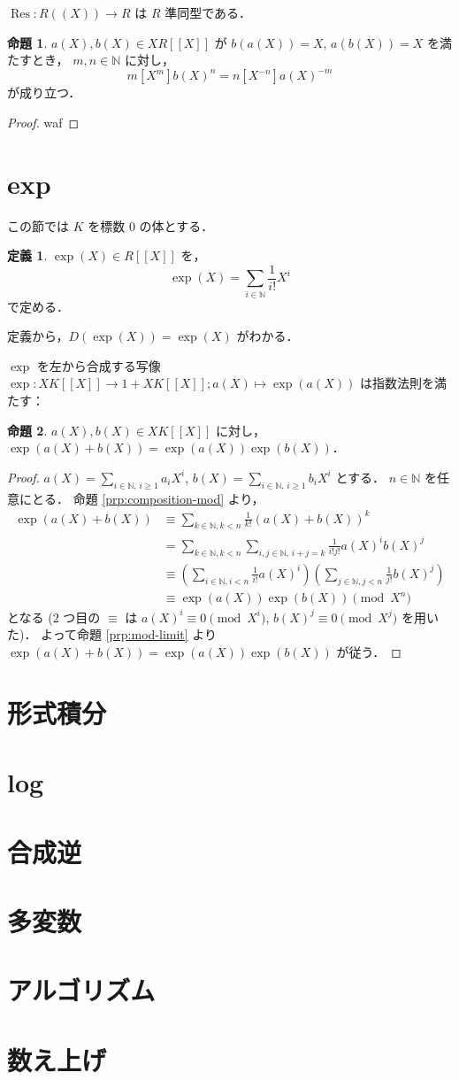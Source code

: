 \documentclass{jsarticle}
\DeclareMathOperator{\Res}{Res}
\newcommand{\N}{\mathbb{N}}
\newcommand{\longto}{\longrightarrow}
\theoremstyle{definition}
\newtheorem*{Dfn}{定義}
\newtheorem{Prp}{命題}
\newenvironment{dfn}{\vspace{1ex}\begin{screen}\begin{Dfn}}{\end{Dfn}\end{screen}\vspace{1ex}}
\newenvironment{prp}{\vspace{1ex}\begin{screen}\begin{Prp}}{\end{Prp}\end{screen}}
\newenvironment{prf}{\begin{leftbar}\begin{proof}}{\end{proof}\end{leftbar}}
\begin{document}
$\Res\colon R((X)) \longto R$ は $R$ 準同型である．

\begin{prp}
  $a(X), b(X) \in X R[[X]]$ が $b(a(X)) = X$, $a(b(X)) = X$ を満たすとき，
  $m, n \in \N$ に対し，
  \[
    m [X^m] b(X)^n = n [X^{-n}] a(X)^{-m}
  \]
  が成り立つ．
\end{prp}
\begin{prf}
  waf
\end{prf}


\section{exp}
この節では $K$ を標数 $0$ の体とする．

\begin{dfn}
  $\exp(X) \in R[[X]]$ を，
  \[
    \exp(X) = \sum_{i\in\N} \frac{1}{i!} X^i
  \]
  で定める．
\end{dfn}

定義から，$D(\exp(X)) = \exp(X)$ がわかる．

$\exp$ を左から合成する写像 $\exp\colon X K[[X]] \longto 1 + X K[[X]]; a(X) \longmapsto \exp(a(X))$ は指数法則を満たす：

\begin{prp}
  $a(X), b(X) \in X K[[X]]$ に対し，$\exp(a(X) + b(X)) = \exp(a(X)) \exp(b(X))$．
\end{prp}
\begin{prf}
  $a(X) = \sum_{i\in\N,\,i\ge 1} a_i X^i$, $b(X) = \sum_{i\in\N,\,i\ge 1} b_i X^i$ とする．
  $n \in \N$ を任意にとる．
  命題 \ref{prp:composition-mod} より，
  \begin{align*}
    \exp(a(X) + b(X))
    &\equiv \sum_{k\in\N,k<n} \frac{1}{k!} (a(X) + b(X))^k \\
    &= \sum_{k\in\N,k<n} \sum_{i,j\in\N,\,i+j=k} \frac{1}{i! j!} a(X)^i b(X)^j \\
    &\equiv \left(\sum_{i\in\N,i<n} \frac{1}{i!} a(X)^i\right) \left(\sum_{j\in\N,j<n} \frac{1}{j!} b(X)^j\right) \\
    &\equiv \exp(a(X)) \exp(b(X))
    \pmod{X^n}
  \end{align*}
  となる ($2$ つ目の $\equiv$ は $a(X)^i \equiv 0 \pmod{X^i}$, $b(X)^j \equiv 0 \pmod{X^j}$ を用いた)．
  よって命題 \ref{prp:mod-limit} より $\exp(a(X) + b(X)) = \exp(a(X)) \exp(b(X))$ が従う．
\end{prf}




\section{形式積分}
\section{log}
\section{合成逆}
\section{多変数}
\section{アルゴリズム}
\section{数え上げ}
\end{document}
